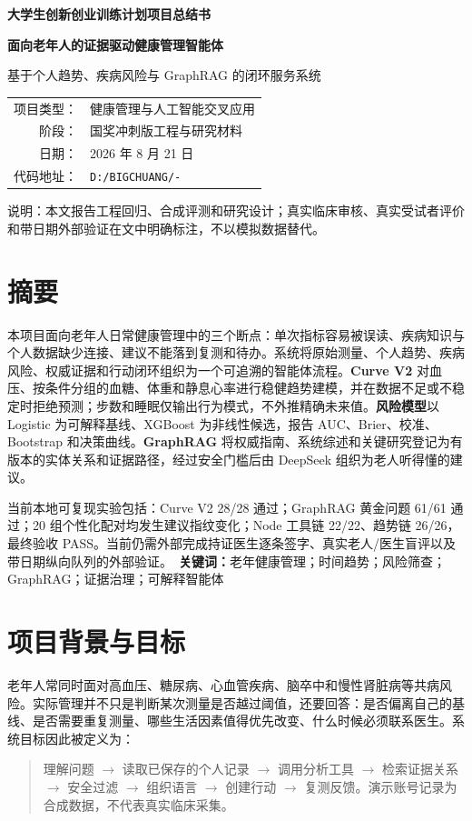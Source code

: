 \documentclass[UTF8,a4paper,zihao=-4]{ctexart}
\begin{document}
\begin{titlepage}
\pagecolor{pale}
\centering
\vspace*{2cm}
{\color{orange}\bfseries 大学生创新创业训练计划项目总结书\par}
\vspace{1.5cm}
{\color{ink}\bfseries 面向老年人的证据驱动健康管理智能体\par}
\vspace{0.4cm}
{\color{ink}基于个人趋势、疾病风险与 GraphRAG 的闭环服务系统\par}
\vspace{2cm}
\begin{tabular}{rl}
项目类型：&健康管理与人工智能交叉应用\\
阶段：&国奖冲刺版工程与研究材料\\
日期：&2026 年 8 月 21 日\\
代码地址：&\texttt{D:/BIGCHUANG/-}\\
\end{tabular}
\vfill
{\color{muted}说明：本文报告工程回归、合成评测和研究设计；真实临床审核、真实受试者评价和带日期外部验证在文中明确标注，不以模拟数据替代。\par}
\end{titlepage}
\pagecolor{white}
\tableofcontents
\newpage

\section{摘要}
本项目面向老年人日常健康管理中的三个断点：单次指标容易被误读、疾病知识与个人数据缺少连接、建议不能落到复测和待办。系统将原始测量、个人趋势、疾病风险、权威证据和行动闭环组织为一个可追溯的智能体流程。\textbf{Curve V2} 对血压、按条件分组的血糖、体重和静息心率进行稳健趋势建模，并在数据不足或不稳定时拒绝预测；步数和睡眠仅输出行为模式，不外推精确未来值。\textbf{风险模型}以 Logistic 为可解释基线、XGBoost 为非线性候选，报告 AUC、Brier、校准、Bootstrap 和决策曲线。\textbf{GraphRAG} 将权威指南、系统综述和关键研究登记为有版本的实体关系和证据路径，经过安全门槛后由 DeepSeek 组织为老人听得懂的建议。

当前本地可复现实验包括：Curve V2 28/28 通过；GraphRAG 黄金问题 61/61 通过；20 组个性化配对均发生建议指纹变化；Node 工具链 22/22、趋势链 26/26，最终验收 PASS。当前仍需外部完成持证医生逐条签字、真实老人/医生盲评以及带日期纵向队列的外部验证。\
\textbf{关键词：}老年健康管理；时间趋势；风险筛查；GraphRAG；证据治理；可解释智能体

\section{项目背景与目标}
老年人常同时面对高血压、糖尿病、心血管疾病、脑卒中和慢性肾脏病等共病风险。实际管理并不只是判断某次测量是否越过阈值，还要回答：是否偏离自己的基线、是否需要重复测量、哪些生活因素值得优先改变、什么时候必须联系医生。系统目标因此被定义为：
\begin{quote}
理解问题 $\rightarrow$ 读取已保存的个人记录 $\rightarrow$ 调用分析工具 $\rightarrow$ 检索证据关系 $\rightarrow$ 安全过滤 $\rightarrow$ 组织语言 $\rightarrow$ 创建行动 $\rightarrow$ 复测反馈。演示账号记录为合成数据，不代表真实临床采集。
\end{quote}
\end{document}
